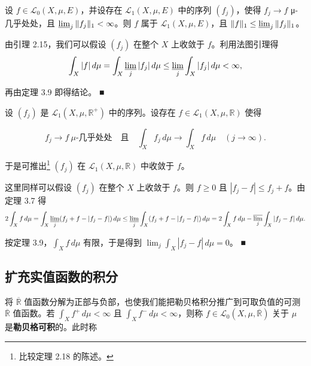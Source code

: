 \begin{conclusion}

\begin{items}
\item

设 $ f \in \mathcal{L}_0(X,\mu,E) $，并设存在 $ \mathcal{L}_1(X,\mu,E) $ 中的序列 $ (f_j) $，使得 $ f_j \to f $ μ-几乎处处，且 $ \varliminf_j \|f_j\|_1 < \infty $。则 $ f $ 属于 $ \mathcal{L}_1(X,\mu,E) $，且 $ \|f\|_1 \le \varliminf_j \|f_j\|_1 $。

\proofhead
由引理 2.15，我们可以假设 $ (f_j) $ 在整个 $ X $ 上收敛于 $ f $。利用法图引理得
\[
\int_X |f|\,d\mu = \int_X \varliminf_j |f_j|\,d\mu \le \varliminf_j \int_X |f_j|\,d\mu < \infty ,
\]

再由定理 3.9 即得结论。 \nobreak\hspace{0.35em}■

\item

设 $ (f_j) $ 是 $ \mathcal{L}_1(X,\mu,\mathbb{R}^+) $ 中的序列。设存在 $ f \in \mathcal{L}_1(X,\mu,\mathbb{R}) $ 使得

\[
f_j \to f \ \mu\text{-几乎处处} \quad \text{且} \quad \int_X f_j\,d\mu \to \int_X f\,d\mu \quad (j \to \infty) .
\]

于是可推出\footnote{比较定理 2.18 的陈述。} $ (f_j) $ 在 $ \mathcal{L}_1(X,\mu,\mathbb{R}) $ 中收敛于 $ f $。

\proofhead
这里同样可以假设 $ (f_j) $ 在整个 $ X $ 上收敛于 $ f $。则 $ f \ge 0 $ 且 $ |f_j - f| \le f_j + f $。由定理 3.7 得
\[
2\int_X f\,d\mu = \int_X \varliminf_j (f_j + f - |f_j - f|)\,d\mu \le \varliminf_j \int_X (f_j + f - |f_j - f|)\,d\mu = 2\int_X f\,d\mu - \varlimsup_j \int_X |f_j - f|\,d\mu .
\]

按定理 3.9，$ \int_X f\,d\mu $ 有限，于是得到 $ \lim_j \int_X |f_j - f|\,d\mu = 0 $。 \nobreak\hspace{0.35em}■

\end{items}

\end{conclusion}

\subsection*{扩充实值函数的积分}

将 $ \overline{\mathbb{R}} $ 值函数分解为正部与负部，也使我们能把勒贝格积分推广到可取负值的可测 $ \overline{\mathbb{R}} $ 值函数。若 $ \int_X f^+\,d\mu < \infty $ 且 $ \int_X f^-\,d\mu < \infty $，则称 $ f \in \mathcal{L}_0(X,\mu,\overline{\mathbb{R}}) $ 关于 $ \mu $ 是\textbf{勒贝格可积}的。此时称

